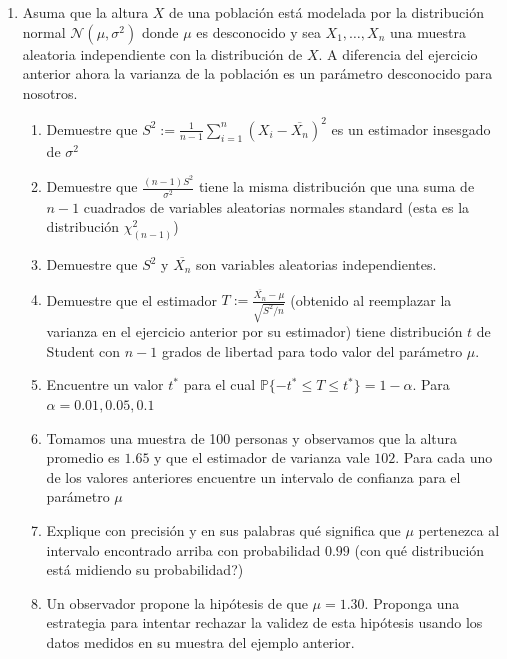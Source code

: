 \documentclass[12pt]{article}
\newcommand{\PP}{\mathbb{P}}
\begin{document}
\begin{enumerate}
\item Asuma que la altura $X$ de una población est\'a modelada por la distribución normal 
$\mathcal{N}(\mu,\sigma^2)$ donde $\mu$ es desconocido y sea $X_1,\dots, X_n$ una muestra 
aleatoria independiente con la distribución de $X$. A diferencia del ejercicio anterior ahora 
la varianza de la población es un parámetro desconocido para nosotros.
\begin{enumerate}

\item Demuestre que $S^2:=\frac{1}{n-1} \sum_{i=1}^n \left(X_i-\overline{X_n}\right)^2$ es un estimador insesgado de $\sigma^2$
\item Demuestre que $\frac{(n-1)S^2}{\sigma^2}$ tiene la misma distribución que una suma de $n-1$ cuadrados de variables aleatorias normales standard (esta es la distribución $\chi^2_{(n-1)}$)
\item Demuestre que $S^2$ y $\overline{X_n}$ son variables aleatorias independientes.
\item Demuestre que el estimador $T:=\frac{\overline{X_n}-\mu}{\sqrt{S^2/n}}$  (obtenido al reemplazar la varianza en el ejercicio anterior por su estimador) tiene distribución $t$ de Student con $n-1$ grados de libertad para todo valor del parámetro $\mu$.
   \item Encuentre un valor $t^*$ para el cual $\PP\{-t^*\leq T\leq t^*\}=1-\alpha$. Para $\alpha=0.01,0.05,0.1$
    \item Tomamos una muestra de 100 personas y observamos que la altura promedio es $1.65$ y que el estimador de varianza vale $102$. Para cada uno de los valores anteriores encuentre un intervalo de confianza para el parámetro $\mu$
    \item Explique con precisión y en sus palabras qué significa que $\mu$ pertenezca al intervalo encontrado arriba con probabilidad $0.99$ (con qué distribución est\'a midiendo su probabilidad?)
    \item Un observador propone la hipótesis de que $\mu=1.30$. 
    Proponga una estrategia para intentar rechazar la validez de esta hipótesis usando los datos medidos en su muestra del ejemplo anterior. 
\end{enumerate}

\end{enumerate}
\end{document}
